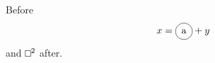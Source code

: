 \documentclass{article}
\begin{document}
Before
\[
x = \begin{tikzpicture}[baseline=-0.5ex]\draw (0,0) circle (3mm); \node {a};\end{tikzpicture} + y
\]
and $\tikz \draw (0,0) rectangle (2mm,2mm);^2$ after.
\end{document}
